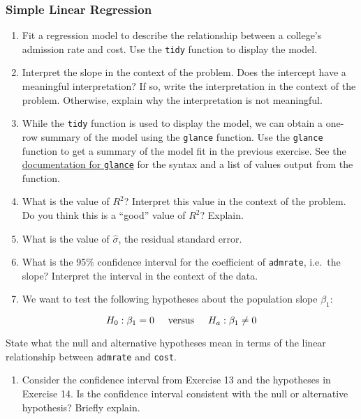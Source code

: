 \documentclass[]{book}
\providecommand{\tightlist}{%
  \setlength{\itemsep}{0pt}\setlength{\parskip}{0pt}}
\begin{document}
\subsubsection{Simple Linear Regression}\label{simple-linear-regression}

\begin{enumerate}
\def\labelenumi{\arabic{enumi}.}
\setcounter{enumi}{7}
\item
  Fit a regression model to describe the relationship between a
  college's admission rate and cost. Use the \texttt{tidy} function to
  display the model.
\item
  Interpret the slope in the context of the problem. Does the intercept
  have a meaningful interpretation? If so, write the interpretation in
  the context of the problem. Otherwise, explain why the interpretation
  is not meaningful.
\item
  While the \texttt{tidy} function is used to display the model, we can
  obtain a one-row summary of the model using the \texttt{glance}
  function. Use the \texttt{glance} function to get a summary of the
  model fit in the previous exercise. See the
  \href{https://rdrr.io/cran/broom/man/glance.lm.html}{documentation for
  \texttt{glance}} for the syntax and a list of values output from the
  function.
\item
  What is the value of \(R^2\)? Interpret this value in the context of
  the problem. Do you think this is a ``good'' value of \(R^2\)?
  Explain.
\item
  What is the value of \(\hat{\sigma}\), the residual standard error.
\item
  What is the 95\% confidence interval for the coefficient of
  \texttt{admrate}, i.e.~the slope? Interpret the interval in the
  context of the data.
\item
  We want to test the following hypotheses about the population slope
  \(\beta_1\):
\end{enumerate}

\[H_0: \beta_1 = 0 \hspace{5mm} \text{versus} \hspace{5mm} H_a: \beta_1 \neq 0\]

State what the null and alternative hypotheses mean in terms of the
linear relationship between \texttt{admrate} and \texttt{cost}.

\begin{enumerate}
\def\labelenumi{\arabic{enumi}.}
\setcounter{enumi}{14}
\tightlist
\item
  Consider the confidence interval from Exercise 13 and the hypotheses
  in Exercise 14. Is the confidence interval consistent with the null or
  alternative hypothesis? Briefly explain.
\end{enumerate}
\end{document}
